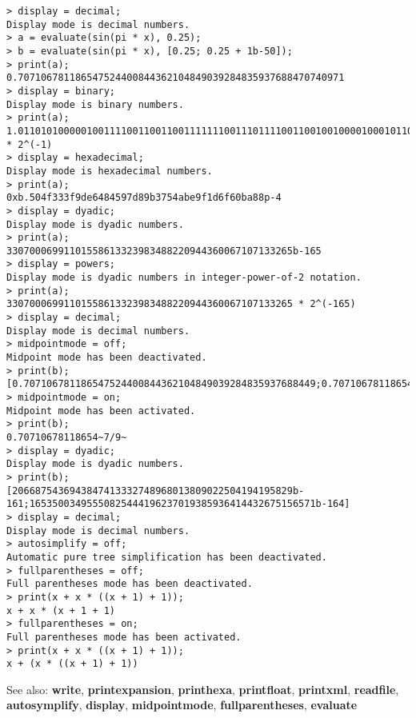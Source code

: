 \begin{center}\begin{minipage}{14.8cm}\begin{Verbatim}[frame=single]
> display = decimal;
Display mode is decimal numbers.
> a = evaluate(sin(pi * x), 0.25);
> b = evaluate(sin(pi * x), [0.25; 0.25 + 1b-50]);
> print(a);
0.707106781186547524400844362104849039284835937688470740971
> display = binary;
Display mode is binary numbers.
> print(a);
1.01101010000010011110011001100111111100111011110011001001000010001011001011111011000100110110011011101010100101010111110100111110001110101101111011000001011101010001_2 * 2^(-1)
> display = hexadecimal;
Display mode is hexadecimal numbers.
> print(a);
0xb.504f333f9de6484597d89b3754abe9f1d6f60ba88p-4
> display = dyadic;
Display mode is dyadic numbers.
> print(a);
33070006991101558613323983488220944360067107133265b-165
> display = powers;
Display mode is dyadic numbers in integer-power-of-2 notation.
> print(a);
33070006991101558613323983488220944360067107133265 * 2^(-165)
> display = decimal;
Display mode is decimal numbers.
> midpointmode = off;
Midpoint mode has been deactivated.
> print(b);
[0.707106781186547524400844362104849039284835937688449;0.707106781186549497437217825175573477826462744170488]
> midpointmode = on;
Midpoint mode has been activated.
> print(b);
0.70710678118654~7/9~
> display = dyadic;
Display mode is dyadic numbers.
> print(b);
[2066875436943847413332748968013809022504194195829b-161;16535003495550825444196237019385936414432675156571b-164]
> display = decimal;
Display mode is decimal numbers.
> autosimplify = off;
Automatic pure tree simplification has been deactivated.
> fullparentheses = off;
Full parentheses mode has been deactivated.
> print(x + x * ((x + 1) + 1));
x + x * (x + 1 + 1)
> fullparentheses = on;
Full parentheses mode has been activated.
> print(x + x * ((x + 1) + 1));
x + (x * ((x + 1) + 1))
\end{Verbatim}
\end{minipage}\end{center}
See also: \textbf{write}, \textbf{printexpansion}, \textbf{printhexa}, \textbf{printfloat}, \textbf{printxml}, \textbf{readfile}, \textbf{autosymplify}, \textbf{display}, \textbf{midpointmode}, \textbf{fullparentheses}, \textbf{evaluate}
